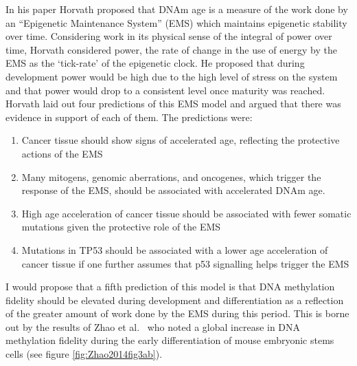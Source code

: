 \documentclass[]{book}
\providecommand{\tightlist}{%
  \setlength{\itemsep}{0pt}\setlength{\parskip}{0pt}}
\begin{document}
In his paper \citep{Horvath2013} Horvath proposed that DNAm age is a measure of the work done by an ``Epigenetic Maintenance System'' (EMS) which maintains epigenetic stability over time. Considering work in its physical sense of the integral of power over time, Horvath considered power, the rate of change in the use of energy by the EMS as the `tick-rate' of the epigenetic clock. He proposed that during development power would be high due to the high level of stress on the system and that power would drop to a consistent level once maturity was reached. Horvath laid out four predictions of this EMS model and argued that there was evidence in support of each of them. The predictions were:

\begin{enumerate}
\def\labelenumi{\arabic{enumi}.}
\tightlist
\item
  Cancer tissue should show signs of accelerated age, reflecting the protective actions of the EMS
\item
  Many mitogens, genomic aberrations, and oncogenes, which trigger the response of the EMS, should be associated with accelerated DNAm age.
\item
  High age acceleration of cancer tissue should be associated with fewer somatic mutations given the protective role of the EMS
\item
  Mutations in TP53 should be associated with a lower age acceleration of cancer tissue if one further assumes that p53 signalling helps trigger the EMS
\end{enumerate}

I would propose that a fifth prediction of this model is that DNA methylation fidelity should be elevated during development and differentiation as a reflection of the greater amount of work done by the EMS during this period. This is borne out by the results of Zhao et al.~\citep{Zhao2014} who noted a global increase in DNA methylation fidelity during the early differentiation of mouse embryonic stems cells (see figure \ref{fig:Zhao2014fig3ab}).
\end{document}
